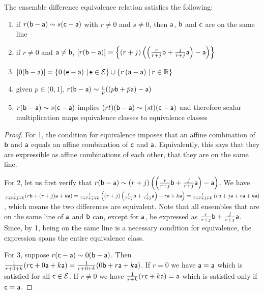 \begin{mathSection}
	\begin{prop}\label{pm-es-ensDiffProps}
		The ensemble difference equivalence relation satisfies the following:
		\begin{enumerate}
			\item if $r(\ens[b] - \ens[a]) \sim s(\ens[c] - \ens[a])$ with $r\neq0$ and $s\neq0$, then $\ens[a]$, $\ens[b]$ and $\ens[c]$ are on the same line
			\item if $r\neq0$ and $\ens[a] \neq \ens[b]$, $[r(\ens[b] - \ens[a])] = \left\{(r+j)\left(\left(\frac{r}{r+j}\ens[b] +\frac{j}{r+j} \ens[a]\right) -\ens[a]\right) \right\}$
			\item $\left[0(\ens[b] - \ens[a])\right] = \left\{0\left(\ens - \ens[a]\right) \, | \, \ens \in \Ens \right\} \cup \left\{r\left(\ens[a] - \ens[a]\right) \, | \, r \in \mathbb{R} \right\}$
			\item given $p \in (0,1]$, $r(\ens[b] - \ens[a]) \sim \frac{r}{p}((p\ens[b] + \bar{p}\ens[a]) - \ens[a])$
			\item $r(\ens[b] - \ens[a]) \sim s(\ens[c] - \ens[a])$ implies $(rt)(\ens[b] - \ens[a]) \sim (st)(\ens[c] - \ens[a])$ and therefore scalar multiplication maps equivalence classes to equivalence classes
		\end{enumerate}
	\end{prop}
	
	\begin{proof}
		For 1, the condition for equivalence imposes that an affine combination of $\ens[b]$ and $\ens[a]$ equals an affine combination of $\ens[c]$ and $\ens[a]$. Equivalently, this says that they are expressible as affine combinations of each other, that they are on the same line.
		
		For 2, let us first verify that $r(\ens[b] - \ens[a]) \sim (r+j)\left(\left(\frac{r}{r+j}\ens[b] +\frac{j}{r+j} \ens[a]\right) -\ens[a]\right)$. We have $\frac{1}{r+r+j+k} (r \ens[b] + (r+j) \ens[a] + k \ens[a]) = \frac{1}{r+r+j+k} \left((r+j)\left(\frac{r}{r+j}\ens[b] +\frac{j}{r+j} \ens[a]\right) + r \ens[a] + k \ens[a]\right)=\frac{1}{r+r+j+k} \left(r\ens[b] +j\ens[a] + r \ens[a] + k \ens[a]\right)$, which means the two differences are equivalent. Note that all ensembles that are on the same line of $\ens[a]$ and $\ens[b]$ can, except for $\ens[a]$, be expressed as $\frac{r}{r+j}\ens[b] +\frac{j}{r+j} \ens[a]$. Since, by 1, being on the same line is a necessary condition for equivalence, the expression spans the entire equivalence class.
		
		For 3, suppose $r (\ens[c] - \ens[a]) \sim 0 (\ens[b] - \ens[a])$. Then $\frac{1}{r+0+k} (r \ens[c] + 0 \ens[a] + k \ens[a]) = \frac{1}{r+0+k} (0 \ens[b] + r \ens[a] + k \ens[a])$. If $r=0$ we have $\ens[a] = \ens[a]$ which is satisfied for all $\ens[c] \in \Ens$. If $r\neq0$ we have $\frac{1}{r+k} (r \ens[c] + k \ens[a]) = \ens[a]$ which is satisfied only if $\ens[c] = \ens[a]$.
		

\end{proof}
\end{mathSection}
